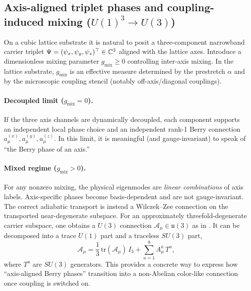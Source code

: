 \subsection{\texorpdfstring{Axis-aligned triplet phases and coupling-induced mixing ($U(1)^3\rightarrow U(3)$)}{Axis-aligned triplet phases and coupling-induced mixing (U(1)^3 -> U(3))}}
\label{subsec:axis-triplet}

On a cubic lattice substrate it is natural to posit a three-component narrowband carrier triplet
$\Psi=(\psi_x,\psi_y,\psi_z)^\top\in\mathbb{C}^3$ aligned with the lattice axes.
Introduce a dimensionless mixing parameter $g_{\mathrm{mix}}\ge 0$ controlling inter-axis mixing.
In the lattice substrate, $g_{\mathrm{mix}}$ is an effective measure determined by the prestretch $\alpha$ and by
the microscopic coupling stencil (notably off-axis/diagonal couplings).

\paragraph{Decoupled limit ($g_{\mathrm{mix}}=0$).}
If the three axis channels are dynamically decoupled, each component supports an independent local phase choice
and an independent rank-1 Berry connection $a_\mu^{(x)},a_\mu^{(y)},a_\mu^{(z)}$.
In this limit, it is meaningful (and gauge-invariant) to speak of ``the Berry phase of an axis.''

\paragraph{Mixed regime ($g_{\mathrm{mix}}>0$).}
For any nonzero mixing, the physical eigenmodes are \emph{linear combinations} of axis labels.
Axis-specific phases become basis-dependent and are not gauge-invariant.
The correct adiabatic transport is instead a Wilczek--Zee connection on the transported near-degenerate subspace.
For an approximately threefold-degenerate carrier subspace, one obtains a $U(3)$ connection
$\mathcal{A}_\mu\in\mathfrak{u}(3)$ as in .
It can be decomposed into a trace $U(1)$ part and a traceless $SU(3)$ part,
\begin{equation}
  \mathcal{A}_\mu
  = \frac{1}{3}\,\mathrm{tr}(\mathcal{A}_\mu)\,I_3
  + \sum_{a=1}^{8} A^a_\mu\,T^a,
\end{equation}
where $T^a$ are $SU(3)$ generators.
This provides a concrete way to express how ``axis-aligned Berry phases'' transition into a non-Abelian color-like
connection once coupling is switched on.

